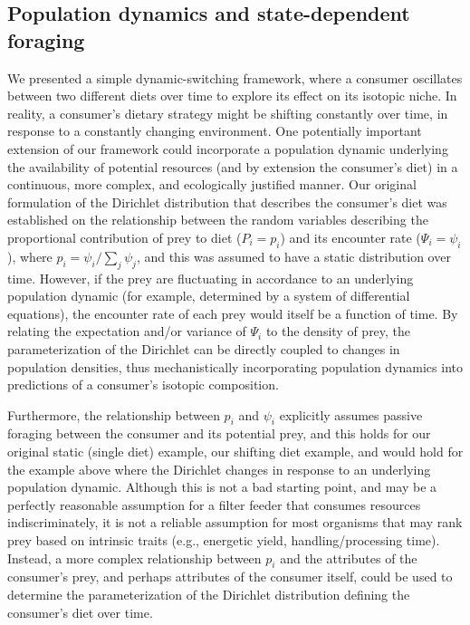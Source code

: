 \documentclass{article}
\begin{document}
\subsection*{Population dynamics and state-dependent foraging}
We presented a simple dynamic-switching framework, where a consumer oscillates between two different diets over time to explore its effect on its isotopic niche.
In reality, a consumer's dietary strategy might be shifting constantly over time, in response to a constantly changing environment.
One potentially important extension of our framework could incorporate a population dynamic underlying the availability of potential resources (and by extension the consumer's diet) in a continuous, more complex, and ecologically justified manner.
Our original formulation of the Dirichlet distribution that describes the consumer's diet was established on the relationship between the random variables describing the proportional contribution of prey to diet ($P_i = p_i$) and its encounter rate ($\Psi_i = \psi_i$), where $p_i = \psi_i/\sum_j \psi_j$, and this was assumed to have a static distribution over time.
However, if the prey are fluctuating in accordance to an underlying population dynamic (for example, determined by a system of differential equations), the encounter rate of each prey would itself be a function of time.
By relating the expectation and/or variance of $\Psi_i$ to the density of prey, the parameterization of the Dirichlet can be directly coupled to changes in population densities, thus mechanistically incorporating population dynamics into predictions of a consumer's isotopic composition.


Furthermore, the relationship between $p_i$ and $\psi_i$ explicitly assumes passive foraging between the consumer and its potential prey, and this holds for our original static (single diet) example, our shifting diet example, and would hold for the example above where the Dirichlet changes in response to an underlying population dynamic.
Although this is not a bad starting point, and may be a perfectly reasonable assumption for a filter feeder that consumes resources indiscriminately, it is not a reliable assumption for most organisms that may rank prey based on intrinsic traits (e.g., energetic yield, handling/processing time).
Instead, a more complex relationship between $p_i$ and the attributes of the consumer's prey, and perhaps attributes of the consumer itself, could be used to determine the parameterization of the Dirichlet distribution defining the consumer's diet over time.
\end{document}
